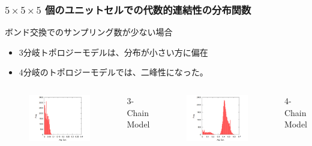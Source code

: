 \documentclass[11pt, dvipdfmx]{beamer}
\begin{document}
\begin{frame}
\frametitle{$5\times5\times5$ 個のユニットセルでの代数的連結性の分布関数}

\begin{exampleblock}{ボンド交換でのサンプリング数が少ない場合}
\begin{itemize}
\item
3分岐トポロジーモデルは、分布が小さい方に偏在
\item
4分岐のトポロジーモデルでは、二峰性になった。
\end{itemize}
\end{exampleblock}
\vspace{-6mm}
\begin{columns}[totalwidth=1\textwidth]
\begin{figure}
\includegraphics[width=1.1\columnwidth]{./fig/Histgram_3Chain_C5.png}
\end{figure}
\vspace{-3mm}
\centering
\small
3-Chain Model

\begin{figure}
\includegraphics[width=1.1\columnwidth]{./fig/Histgram_4Chain_C5.png}
\end{figure}
\vspace{-2mm}
\centering
\small
4-Chain Model
\normalsize


\end{columns}
\end{frame}
\end{document}
